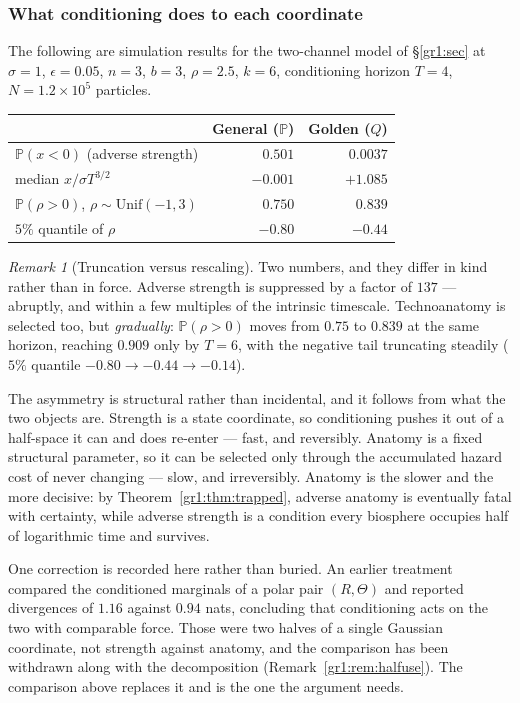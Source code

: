 \documentclass[11pt]{article}
\numberwithin{equation}{section}
\theoremstyle{plain}
\theoremstyle{definition}
\theoremstyle{remark}
\newtheorem{remark}[theorem]{Remark}
\newcommand{\PP}{\mathbb{P}}
\begin{document}
\subsubsection{What conditioning does to each coordinate}
\label{gr:subsub:measured}

The following are simulation results for the two-channel model of
\S\ref{gr1:sec} at $\sigma=1$, $\epsilon=0.05$, $n=3$, $b=3$, $\rho=2.5$,
$k=6$, conditioning horizon $T=4$, $N=1.2\times10^{5}$ particles.

\begin{center}\small
\begin{tabular}{@{}lrr@{}}
\toprule
& General ($\PP$) & Golden ($Q$)\\
\midrule
$\PP(x<0)$ (adverse strength) & $0.501$ & $0.0037$\\
median $x/\sigma T^{3/2}$ & $-0.001$ & $+1.085$\\
$\PP(\rho>0)$, $\rho\sim\mathrm{Unif}(-1,3)$ & $0.750$ & $0.839$\\
$5\%$ quantile of $\rho$ & $-0.80$ & $-0.44$\\
\bottomrule
\end{tabular}
\end{center}

\begin{remark}[Truncation versus rescaling]\label{gr:rem:truncresc}
Two numbers, and they differ in kind rather than in force.
Adverse strength is suppressed by a factor of $137$ --- abruptly, and
within a few multiples of the intrinsic timescale. Technoanatomy is
selected too, but \emph{gradually}: $\PP(\rho>0)$ moves from $0.75$ to
$0.839$ at the same horizon, reaching $0.909$ only by $T=6$, with the
negative tail truncating steadily ($5\%$ quantile $-0.80\to-0.44\to
-0.14$).

The asymmetry is structural rather than incidental, and it follows from
what the two objects are. Strength is a state coordinate, so
conditioning pushes it out of a half-space it can and does re-enter ---
fast, and reversibly. Anatomy is a fixed structural parameter, so it can
be selected only through the accumulated hazard cost of never changing
--- slow, and irreversibly. Anatomy is the slower and the more decisive:
by Theorem~\ref{gr1:thm:trapped}, adverse anatomy is eventually fatal
with certainty, while adverse strength is a condition every biosphere
occupies half of logarithmic time and survives.

One correction is recorded here rather than buried. An earlier treatment
compared the conditioned marginals of a polar pair $(R,\Theta)$ and
reported divergences of $1.16$ against $0.94$ nats, concluding that
conditioning acts on the two with comparable force. Those were two
halves of a single Gaussian coordinate, not strength against anatomy,
and the comparison has been withdrawn along with the decomposition
(Remark~\ref{gr1:rem:halfuse}). The comparison above replaces it and is
the one the argument needs.
\end{remark}
\end{document}
